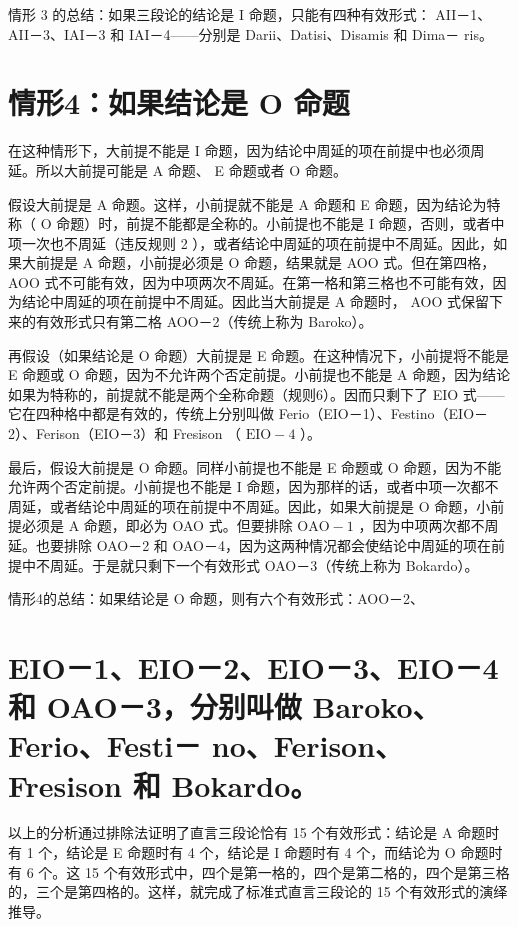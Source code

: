 情形 3 的总结：如果三段论的结论是 I 命题，只能有四种有效形式： AII－1、AII－3、IAI－3 和 IAI－4——分别是 Darii、Datisi、Disamis 和 Dima－ ris。

\section*{情形4：如果结论是 $\mathbf{O}$ 命题}
在这种情形下，大前提不能是 I 命题，因为结论中周延的项在前提中也必须周延。所以大前提可能是 A 命题、 E 命题或者 O 命题。

假设大前提是 A 命题。这样，小前提就不能是 A 命题和 E 命题，因为结论为特称（ O 命题）时，前提不能都是全称的。小前提也不能是 I 命题，否则，或者中项一次也不周延（违反规则 2 ），或者结论中周延的项在前提中不周延。因此，如果大前提是 A 命题，小前提必须是 O 命题，结果就是 AOO 式。但在第四格， AOO 式不可能有效，因为中项两次不周延。在第一格和第三格也不可能有效，因为结论中周延的项在前提中不周延。因此当大前提是 A 命题时， AOO 式保留下来的有效形式只有第二格 AOO－2（传统上称为 Baroko）。

再假设（如果结论是 O 命题）大前提是 E 命题。在这种情况下，小前提将不能是 E 命题或 O 命题，因为不允许两个否定前提。小前提也不能是 A 命题，因为结论如果为特称的，前提就不能是两个全称命题（规则6）。因而只剩下了 EIO 式——它在四种格中都是有效的，传统上分别叫做 Ferio（EIO－1）、Festino（EIO－2）、Ferison（EIO－3）和 Fresison （ $\mathrm{EIO}-4$ ）。

最后，假设大前提是 O 命题。同样小前提也不能是 E 命题或 O 命题，因为不能允许两个否定前提。小前提也不能是 I 命题，因为那样的话，或者中项一次都不周延，或者结论中周延的项在前提中不周延。因此，如果大前提是 O 命题，小前提必须是 A 命题，即必为 OAO 式。但要排除 $\mathrm{OAO}-1$ ，因为中项两次都不周延。也要排除 OAO－2 和 OAO－4，因为这两种情况都会使结论中周延的项在前提中不周延。于是就只剩下一个有效形式 OAO－3（传统上称为 Bokardo）。

情形4的总结：如果结论是 O 命题，则有六个有效形式：AOO－2、

\section*{EIO－1、EIO－2、EIO－3、EIO－4 和 OAO－3，分别叫做 Baroko、Ferio、Festi－ no、Ferison、Fresison 和 Bokardo。}
以上的分析通过排除法证明了直言三段论恰有 15 个有效形式：结论是 A 命题时有 1 个，结论是 E 命题时有 4 个，结论是 I 命题时有 4 个，而结论为 O 命题时有 6 个。这 15 个有效形式中，四个是第一格的，四个是第二格的，四个是第三格的，三个是第四格的。这样，就完成了标准式直言三段论的 15 个有效形式的演绎推导。

